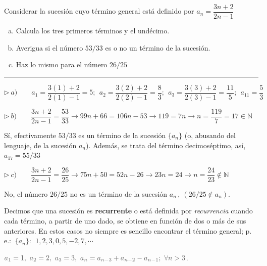 \begin{miejercicio}

Considerar la sucesión cuyo término general está definido por  $a_n=\dfrac{3n+2}{2n-1}	$

\begin{enumerate}[a) ]
\vspace{-2mm} \item Calcula los tres primeros términos y el undécimo.
\vspace{-3mm} \item Averigua si el número $53/33$ es o no un término de la sucesión.
\vspace{-3mm} \item Haz lo mismo para el número $26/25$
\end{enumerate}

\vspace{-4mm}
\rule{250pt}{0.1pt}
\vspace{5mm}

$\triangleright \ a)\qquad a_1=\dfrac{3(1)+2}{2(1)-1}=5;\ \ a_2=\dfrac{3(2)+2}{2(2)-1}=\dfrac 8 3 ;\ \ a_3=\dfrac{3(3)+2}{2(3)-1}=\dfrac{11}{5};\ \ a_11=\dfrac 5 3$

\vspace{2mm}$\triangleright \ b)\qquad \dfrac{3n+2}{2n-1}=\dfrac {53}{33} \to 99n+66=106n-53 \to 119=7n \to n=\dfrac{119}{7}=17 \in \mathbb N $

\vspace{2mm}Sí, efectivamente ${53}/{33}$ es un término de la sucesión $\{a_n\}$ (o, abusando del lenguaje, de la sucesión $a_n$). Además, se trata del término decimoséptimo, así, $a_{17}=55/33$

\vspace{2mm}$\triangleright \ c)\qquad \dfrac{3n+2}{2n-1}=\dfrac{26}{25} \to 75n+50=52n-26 \to 23n=24 \to n=\dfrac{24}{23} \notin \mathbb N$

\vspace{2mm}No, el número $26/25$ no es un término de la sucesión $a_n \, , \ (26/25 \notin a_n)$.

\end{miejercicio}

Decimos que una sucesión es \textbf{recurrente} o está definida por \emph{recurrencia} cuando cada término, a partir de uno dado, se obtiene en función de dos o más de sus  anteriores. En estos casos no siempre es sencillo encontrar el término general; p. e.: $\ \{a_n\}:\ \ 1, 2, 3, 0, 5, -2, 7, \cdots$

$\textcolor{gris}{a_1=1,\ a_2=2,\ a_3=3,\ a_n=a_{n-3}+a_{n-2}-a_{n-1};\ \forall n>3}$.

